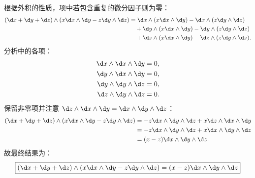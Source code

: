 \begin{solution}
    根据外积的性质，项中若包含重复的微分因子则为零：
    \begin{equation}
        \begin{aligned}
            (\d x + \d y + \d z) \wedge (x \d x \wedge \d y - z \d y \wedge \d z) & = \d x \wedge (x \d x \wedge \d y) - \d x \wedge (z \d y \wedge \d z)        \\
                                                                                  & \quad + \d y \wedge (x \d x \wedge \d y) - \d y \wedge (z \d y \wedge \d z)  \\
                                                                                  & \quad + \d z \wedge (x \d x \wedge \d y) - \d z \wedge (z \d y \wedge \d z).
        \end{aligned}
        \label{eq:ext-prod-2-step1}
    \end{equation}
    分析中的各项：
    \begin{equation}
        \begin{aligned}
            \d x \wedge \d x \wedge \d y & = 0, \\
            \d y \wedge \d x \wedge \d y & = 0, \\
            \d y \wedge \d y \wedge \d z & = 0, \\
            \d z \wedge \d y \wedge \d z & = 0.
        \end{aligned}
        \label{eq:ext-prod-2-zero-terms}
    \end{equation}
    保留非零项并注意 $\d z \wedge \d x \wedge \d y = \d x \wedge \d y \wedge \d z$：
    \begin{equation}
        \begin{aligned}
            (\d x + \d y + \d z) \wedge (x \d x \wedge \d y - z \d y \wedge \d z) & = -z \d x \wedge \d y \wedge \d z + x \d z \wedge \d x \wedge \d y \\
                                                                                  & = -z \d x \wedge \d y \wedge \d z + x \d x \wedge \d y \wedge \d z \\
                                                                                  & = (x - z) \d x \wedge \d y \wedge \d z.
        \end{aligned}
        \label{eq:ext-prod-2-final}
    \end{equation}
    故最终结果为：
    \begin{equation}
        \boxed{(\d x + \d y + \d z) \wedge (x \d x \wedge \d y - z \d y \wedge \d z) = (x - z) \d x \wedge \d y \wedge \d z}
    \end{equation}
\end{solution}


